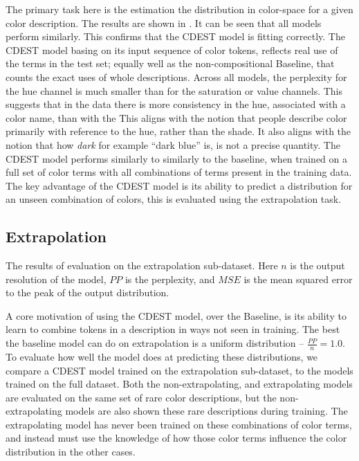 \documentclass[11pt,letterpaper]{article}
\begin{document}
The primary task here is the estimation the distribution in color-space for a given color description.
The results are shown in .
It can be seen that all models perform similarly.
This confirms that the CDEST model is fitting correctly.
The CDEST model basing on its input sequence of color tokens,
reflects real use of the terms in the test set; 
equally well as the non-compositional Baseline, that counts the exact uses of whole descriptions.
Across all models, the perplexity for the hue channel is much smaller than for the saturation or value channels.
This suggests that in the data there is more consistency in the hue, associated with a color name, than with the 
This aligns with the notion that people describe color primarily with reference to the hue, rather than the shade.
It also aligns with the notion that how \emph{dark} for example ``dark blue'' is, is not a precise quantity.
The CDEST model performs similarly to similarly to the baseline, when trained on a full set of color terms with all combinations of terms present in the training data.
The key advantage of the CDEST model is its ability to predict a distribution for an unseen combination of colors, this is evaluated using the extrapolation task.

\subsection{Extrapolation}

\begin{table*}
	\centering
	\caption{\label{tblresextrapo} The results of evaluation on the extrapolation sub-dataset. Here $n$ is the output resolution of the model, $PP$ is the perplexity, and $MSE$ is the mean squared error to the peak of the output distribution.}
\end{table*}


A core motivation of using the CDEST model, over the Baseline, is its ability to learn to combine tokens in a description in ways not seen in training.
The best the baseline model can do on extrapolation is a uniform distribution -- $\frac{PP}{n}=1.0$.
To evaluate how well the model does at predicting these distributions,
we compare a CDEST model trained on the extrapolation sub-dataset, to the models trained on the full dataset.
Both the non-extrapolating, and extrapolating models are evaluated on the same set of rare color descriptions,
but the non-extrapolating models are also shown these rare descriptions during training.
The extrapolating model has never been trained on these combinations of color terms,
and instead must use the knowledge of how those color terms influence the color distribution in the other cases.
\end{document}
